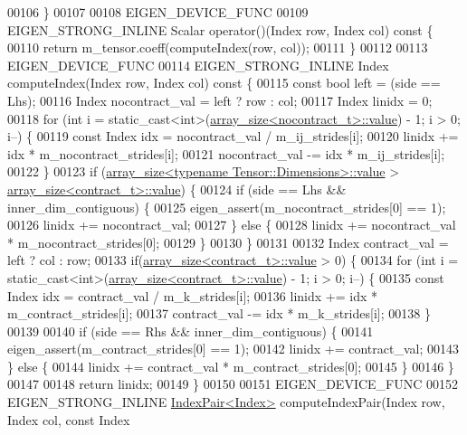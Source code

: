 \begin{DoxyCode}
00106   \}
00107 
00108   EIGEN\_DEVICE\_FUNC
00109   EIGEN\_STRONG\_INLINE Scalar operator()(Index row, Index col)\textcolor{keyword}{ const }\{
00110     \textcolor{keywordflow}{return} m\_tensor.coeff(computeIndex(row, col));
00111   \}
00112 
00113   EIGEN\_DEVICE\_FUNC
00114   EIGEN\_STRONG\_INLINE Index computeIndex(Index row, Index col)\textcolor{keyword}{ const }\{
00115     \textcolor{keyword}{const} \textcolor{keywordtype}{bool} left = (side == Lhs);
00116     Index nocontract\_val = left ? row : col;
00117     Index linidx = 0;
00118     \textcolor{keywordflow}{for} (\textcolor{keywordtype}{int} i = static\_cast<int>(\hyperlink{struct_eigen_1_1internal_1_1array__size}{array\_size<nocontract\_t>::value}) - 1; i > 
      0; i--) \{
00119       \textcolor{keyword}{const} Index idx = nocontract\_val / m\_ij\_strides[i];
00120       linidx += idx * m\_nocontract\_strides[i];
00121       nocontract\_val -= idx * m\_ij\_strides[i];
00122     \}
00123     \textcolor{keywordflow}{if} (\hyperlink{struct_eigen_1_1internal_1_1array__size}{array\_size<typename Tensor::Dimensions>::value} > 
      \hyperlink{struct_eigen_1_1internal_1_1array__size}{array\_size<contract\_t>::value}) \{
00124       \textcolor{keywordflow}{if} (side == Lhs && inner\_dim\_contiguous) \{
00125         eigen\_assert(m\_nocontract\_strides[0] == 1);
00126         linidx += nocontract\_val;
00127       \} \textcolor{keywordflow}{else} \{
00128         linidx += nocontract\_val * m\_nocontract\_strides[0];
00129       \}
00130     \}
00131 
00132     Index contract\_val = left ? col : row;
00133     \textcolor{keywordflow}{if}(\hyperlink{struct_eigen_1_1internal_1_1array__size}{array\_size<contract\_t>::value} > 0) \{
00134       \textcolor{keywordflow}{for} (\textcolor{keywordtype}{int} i = static\_cast<int>(\hyperlink{struct_eigen_1_1internal_1_1array__size}{array\_size<contract\_t>::value}) - 1; i > 0;
       i--) \{
00135         \textcolor{keyword}{const} Index idx = contract\_val / m\_k\_strides[i];
00136         linidx += idx * m\_contract\_strides[i];
00137         contract\_val -= idx * m\_k\_strides[i];
00138       \}
00139 
00140       \textcolor{keywordflow}{if} (side == Rhs && inner\_dim\_contiguous) \{
00141         eigen\_assert(m\_contract\_strides[0] == 1);
00142         linidx += contract\_val;
00143       \} \textcolor{keywordflow}{else} \{
00144         linidx += contract\_val * m\_contract\_strides[0];
00145       \}
00146     \}
00147 
00148     \textcolor{keywordflow}{return} linidx;
00149   \}
00150 
00151   EIGEN\_DEVICE\_FUNC
00152   EIGEN\_STRONG\_INLINE \hyperlink{struct_eigen_1_1_index_pair}{IndexPair<Index>} computeIndexPair(Index row, Index col, \textcolor{keyword}{const} Index 

\end{DoxyCode}
